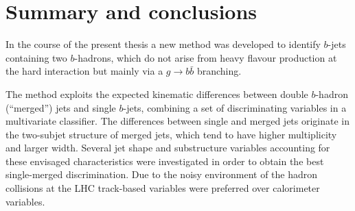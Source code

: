 %
%
\chapter{Summary and conclusions}\label{ch:conclusions}

In the course of the present thesis a new method was developed  %
to identify $b$-jets containing two $b$-hadrons, which do not arise from heavy flavour production at the hard interaction but mainly via a $g \rightarrow b\bar{b}$ branching.

The method exploits the expected kinematic differences between double $b$-hadron (``merged'') jets and single $b$-jets, combining a set of discriminating variables in a multivariate classifier.  The differences between single and merged jets originate in the two-subjet structure of merged jets,  %
which tend to have higher multiplicity and larger width. Several jet shape and substructure variables accounting for these envisaged characteristics were investigated in order to obtain the best single-merged discrimination.  Due to the noisy environment of the hadron collisions at the LHC track-based variables were preferred over calorimeter variables.   %

